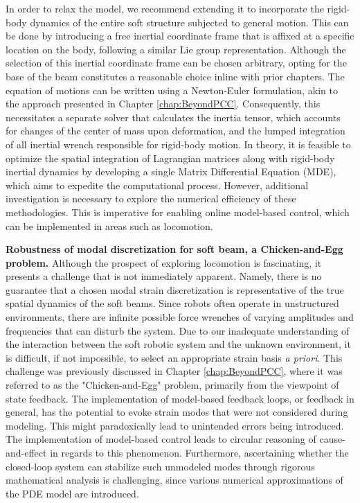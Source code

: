 In order to relax the model, we recommend extending it to incorporate the rigid-body dynamics of the entire soft structure subjected to general motion. This can be done by introducing a free inertial coordinate frame that is affixed at a specific location on the body, following a similar  Lie group representation. Although the selection of this inertial coordinate frame can be chosen arbitrary, opting for the base of the beam constitutes a reasonable choice inline with prior chapters. The equation of motions can be written using a Newton-Euler formulation, akin to the approach presented in Chapter \ref{chap:BeyondPCC}. Consequently, this necessitates a separate solver that calculates the inertia tensor, which accounts for changes of the center of mass upon deformation, and the lumped integration of all inertial wrench responsible for rigid-body motion. In theory, it is feasible to optimize the spatial integration of Lagrangian matrices along with rigid-body inertial dynamics by developing a single Matrix Differential Equation (MDE), which aims to expedite the computational process. However, additional investigation is necessary to explore the numerical efficiency of these methodologies. This is imperative for enabling online model-based control, which can be implemented in areas such as locomotion.

\textbf{Robustness of modal discretization for soft beam, a Chicken-and-Egg problem.} Although the prospect of exploring locomotion is fascinating, it presents a challenge that is not immediately apparent. Namely, there is no guarantee that a chosen modal strain discretization is representative of the true spatial dynamics of the soft beams. Since robots often operate in unstructured environments, there are infinite possible force wrenches of varying amplitudes and frequencies that can disturb the system. Due to our inadequate understanding of the interaction between the soft robotic system and the unknown environment, it is difficult, if not impossible, to select an appropriate strain basis \textit{a priori}. This challenge was previously discussed in Chapter \ref{chap:BeyondPCC}, where it was referred to as the "Chicken-and-Egg" problem, primarily from the viewpoint of state feedback. The implementation of model-based feedback loops, or feedback in general, has the potential to evoke strain modes that were not considered during modeling. This might paradoxically lead to unintended errors being introduced. The implementation of model-based control leads to circular reasoning of cause-and-effect in regards to this phenomenon. Furthermore, ascertaining whether the closed-loop system can stabilize such unmodeled modes through rigorous mathematical analysis is challenging, since various numerical approximations of the PDE model are introduced.

